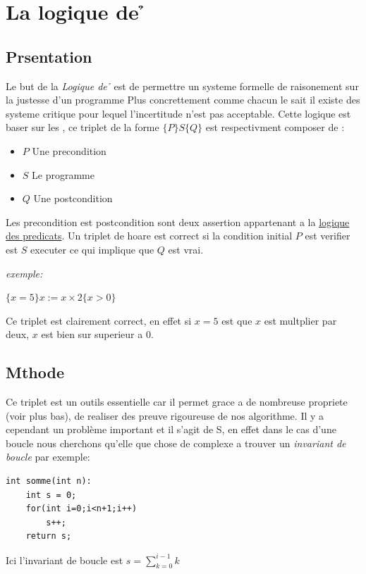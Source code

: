 \documentclass[French,Hoar.tex]{subfiles}
\begin{document}
  \section{La logique de \h}
  \subsection{Pr\e sentation}
    Le but de la \emph{Logique de \h} est de permettre un systeme formelle de raisonement 
    sur la justesse d'un programme
    Plus concrettement comme chacun le sait il existe des systeme critique pour lequel l'incertitude
    n'est pas acceptable.
    Cette logique est baser sur les \textbf{\color{nred}{ triplet de \h}},
    ce triplet de la forme $\{P\} S \{Q\}$ est respectivment composer de :
    \begin{itemize}
      \item[\ding{227}] $P$ Une precondition
      \item[\ding{227}] $S$ Le programme
      \item[\ding{227}] $Q$ Une postcondition
    \end{itemize}
    Les precondition est postcondition sont deux assertion appartenant a la \href{http://zanotti.univ-tln.fr/MD/MD-Ensembles.html#pr%C3%A9dicats}{logique des predicats}.
    Un triplet de hoare est correct si la condition initial $P$ est verifier est $S$ executer ce qui implique que
    $Q$ est vrai.

    \emph{exemple:}
    \begin{center}
     $\{x = 5\} x := x\times 2 \{x > 0\}$ 
    \end{center}
    Ce triplet est clairement correct, en effet si $x=5$ est que $x$ est multplier par deux, $x$ est bien sur 
    superieur a 0.


  \subsection{M\e thode}
  Ce triplet est un outils essentielle car il permet grace a de nombreuse propriete (voir plus bas), de realiser des preuve rigoureuse de nos 
  algorithme. Il y a cependant un problème important et il s'agit de S, en effet dans le cas d'une boucle nous cherchons qu'elle que chose de complexe 
  a trouver un \emph{invariant de boucle} par exemple:
  \begin{lstlisting}[style=C]
  int somme(int n):
    int s = 0;
    for(int i=0;i<n+1;i++)
        s++;
    return s;
\end{lstlisting}
Ici l'invariant de boucle est $s=\sum_{k=0}^{i-1} k$
\end{document}
